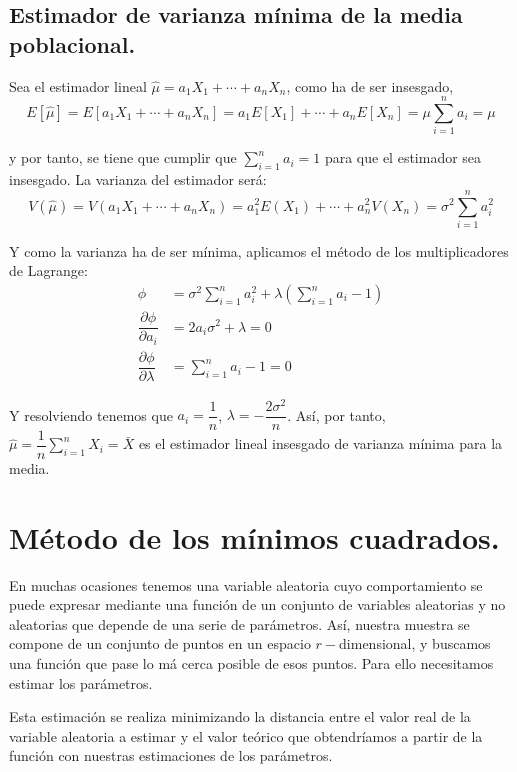 \subsection{Estimador de varianza m\'inima de la media poblacional.}

Sea el estimador lineal $\hat{\mu}=a_1X_1+\cdots+a_nX_n$, como ha de ser insesgado, 
\begin{equation*}
E\left[\hat{\mu}\right]=E\left[a_1X_1+\cdots+a_nX_n\right]=a_1E\left[X_1\right]+\cdots+a_nE\left[X_n\right]=\mu\sum_{i=1}^na_i=\mu
\end{equation*}

y por tanto, se tiene que cumplir que $\sum_{i=1}^na_i=1$ para que el estimador sea insesgado.
La varianza del estimador ser\'a:
\begin{equation*}
V\left(\hat{\mu}\right)=V\left(a_1X_1+\cdots+a_nX_n\right)=a_1^2E\left(X_1\right)+\cdots+a_n^2V\left(X_n\right)=\sigma^2\sum_{i=1}^na_i^2
\end{equation*}

Y como la varianza ha de ser m\'inima, aplicamos el m\'etodo de los multiplicadores de Lagrange:
\begin{align*}
\phi&=\sigma^2\sum_{i=1}^na_i^2+\lambda\left(\sum_{i=1}^na_i-1\right) \\
\dfrac{\partial\phi}{\partial a_i}&=2a_i\sigma^2+\lambda=0 \\
\dfrac{\partial\phi}{\partial\lambda}&=\sum_{i=1}^na_i-1=0
\end{align*}

Y resolviendo tenemos que $a_i=\dfrac{1}{n}$, $\lambda=-\dfrac{2\sigma^2}{n}$. As\'i, por tanto, $\hat{\mu}=\dfrac{1}{n}\sum_{i=1}^nX_i=\bar{X}$ es el estimador lineal insesgado de varianza m\'inima para la media.



\section{M\'etodo de los m\'inimos cuadrados.}
En muchas ocasiones tenemos una variable aleatoria cuyo comportamiento se puede expresar mediante una funci\'on de un conjunto de variables aleatorias y no aleatorias que depende de una serie de par\'ametros. As\'i, nuestra muestra se compone de un conjunto de puntos en un espacio $r-$dimensional, y buscamos una funci\'on que pase lo m\'a cerca posible de esos puntos. Para ello necesitamos estimar los par\'ametros.

Esta estimaci\'on se realiza minimizando la distancia entre el valor real de la variable aleatoria  a estimar y el valor te\'orico que obtendr\'iamos a partir de la funci\'on con nuestras estimaciones de los par\'ametros.

